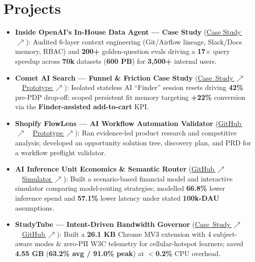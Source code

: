 \documentclass[10pt,a4paper]{article}
\begin{document}
\section*{Projects}
\begin{itemize}[itemsep=1.2pt]\small
\item \textbf{Inside OpenAI's In-House Data Agent --- Case Study} (\href{https://krishnamurthi-apm-portfolio.vercel.app/teardowns/openai-data-agent}{Case Study\,$\nearrow$}): Audited 6-layer context engineering (Git/Airflow lineage, Slack/Docs memory, RBAC) and \textbf{200+} golden-question evals driving a \textbf{17$\times$} query speedup across \textbf{70k} datasets (\textbf{600 PB}) for \textbf{3,500+} internal users.
\item \textbf{Comet AI Search --- Funnel \& Friction Case Study} \mbox{(\href{https://krishnamurthi-apm-portfolio.vercel.app/teardowns/comet}{Case Study\,$\nearrow$} \textbar\ \href{https://relay-define-38337038.figma.site/}{Prototype\,$\nearrow$})}: Isolated stateless AI ``Finder'' session resets driving \textbf{42\%} pre-PDP drop-off; scoped persistent fit memory targeting \textbf{+22\%} conversion via the \textbf{Finder-assisted add-to-cart} KPI.
\item \textbf{Shopify FlowLens --- AI Workflow Automation Validator} \mbox{(\href{https://github.com/krishnamurthi-ramesh/Shopify-Flow-Lens}{GitHub\,$\nearrow$} \textbar\ \href{https://shopify-flowlens.vercel.app}{Prototype\,$\nearrow$})}: Ran evidence-led product research and competitive analysis; developed an opportunity solution tree, discovery plan, and PRD for a workflow preflight validator.
\item \textbf{AI Inference Unit Economics \& Semantic Router} \mbox{(\href{https://github.com/krishnamurthi-ramesh/AI-Cost-Optimizer}{GitHub\,$\nearrow$} \textbar\ \href{https://ai-cost-optimizer-iota.vercel.app}{Simulator\,$\nearrow$})}: Built a scenario-based financial model and interactive simulator comparing model-routing strategies; modelled \textbf{66.8\%} lower inference spend and \textbf{57.1\%} lower latency under stated \textbf{100k-DAU} assumptions.
\item \textbf{StudyTube --- Intent-Driven Bandwidth Governor} \mbox{(\href{https://krishnamurthi-apm-portfolio.vercel.app/projects/study-tube}{Case Study\,$\nearrow$} \textbar\ \href{https://github.com/krishnamurthi-ramesh/Study-Tube}{GitHub\,$\nearrow$})}: Built a \textbf{26.1 KB} Chrome MV3 extension with 4 subject-aware modes \& zero-PII W3C telemetry for cellular-hotspot learners; saved \textbf{4.55 GB} (\textbf{63.2\% avg / 91.0\% peak}) at \textbf{$<$0.2\%} CPU overhead.
\end{itemize}
\end{document}
